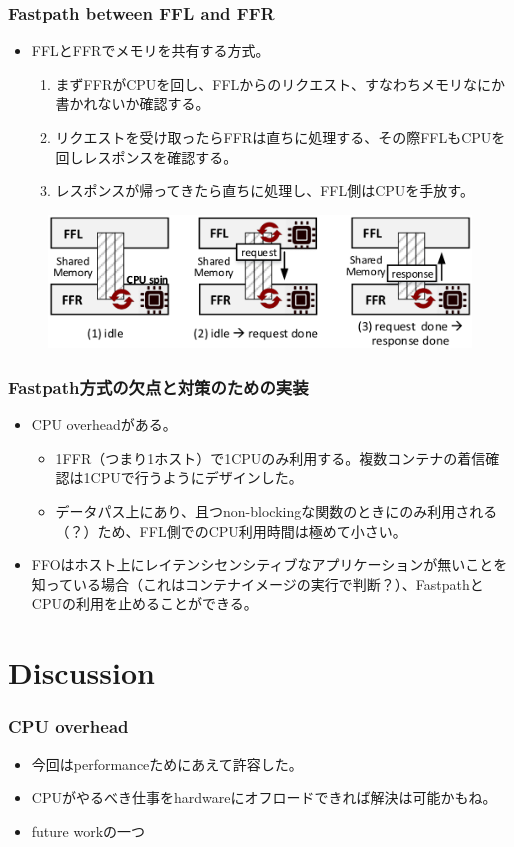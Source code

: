\documentclass[dvipdfmx,9pt,notheorems]{beamer}
\theoremstyle{definition}
\begin{document}
\begin{frame}\frametitle{Fastpath between FFL and FFR}
	\begin{itemize}
		\item FFLとFFRでメモリを共有する方式。
		\begin{enumerate}
			\item まずFFRがCPUを回し、FFLからのリクエスト、すなわちメモリなにか書かれないか確認する。
			\item リクエストを受け取ったらFFRは直ちに処理する、その際FFLもCPUを回しレスポンスを確認する。
			\item レスポンスが帰ってきたら直ちに処理し、FFL側はCPUを手放す。
	  \end{enumerate}
	\end{itemize}
  \begin{figure}[htb]
    \centering
    \includegraphics[scale=1]{fig/figure8.png}
  \end{figure}
\end{frame}

\begin{frame}\frametitle{Fastpath方式の欠点と対策のための実装}
	\begin{itemize}
		\item CPU overheadがある。
		\begin{itemize}
			\item 1FFR（つまり1ホスト）で1CPUのみ利用する。複数コンテナの着信確認は1CPUで行うようにデザインした。
			\item データパス上にあり、且つnon-blockingな関数のときにのみ利用される（？）ため、FFL側でのCPU利用時間は極めて小さい。
		\end{itemize}
		\item FFOはホスト上にレイテンシセンシティブなアプリケーションが無いことを知っている場合（これはコンテナイメージの実行で判断？）、FastpathとCPUの利用を止めることができる。
	\end{itemize}
\end{frame}

\section{Discussion}
\begin{frame}\frametitle{CPU overhead}
	\begin{itemize}
		\item 今回はperformanceためにあえて許容した。
		\item CPUがやるべき仕事をhardwareにオフロードできれば解決は可能かもね。
		\item future workの一つ
	\end{itemize}
\end{frame}
\end{document}
